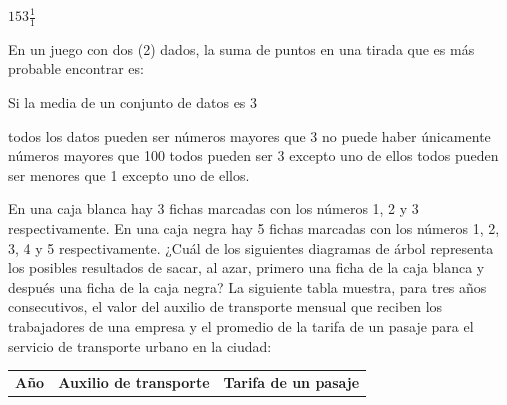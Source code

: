 \documentclass[10pt,letterpaper,addpoints]{exam}
\begin{document}
\begin{multicols}{2}
\begin{questions}
\begin{oneparchoices}
\choice $153 \frac{1}{1}$
\end{oneparchoices}
\question En un juego con dos (2) dados, la suma de puntos en una tirada que es más probable encontrar es:

\begin{oneparchoices}
\end{oneparchoices}
\question Si la media de un conjunto de datos es 3
\begin{choices}
\choice todos los datos pueden ser números mayores que 3
\CorrectChoice no puede haber únicamente números mayores que 100
\choice todos pueden ser 3 excepto uno de ellos
\choice todos pueden ser menores que 1 excepto uno de ellos.
\end{choices}
\question En una caja blanca hay 3 fichas marcadas con los números 1, 2 y 3 respectivamente. En una caja negra hay 5 fichas marcadas con los números 1, 2, 3, 4 y 5 respectivamente. ¿Cuál de los siguientes diagramas de árbol representa los posibles resultados de sacar, al
azar, primero una ficha de la caja blanca y después una ficha de la caja negra?
\question La siguiente tabla muestra, para tres años consecutivos, el valor del auxilio de transporte mensual que reciben los trabajadores de una empresa y el promedio de la tarifa de un pasaje para el servicio de transporte urbano en la ciudad:
\begin{center}
\begin{tabular}{|c|p{3cm}|p{3cm}|}
\hline 
\textbf{Año} & \textbf{Auxilio de transporte} & \textbf{Tarifa de un pasaje} \\ 

\end{tabular}
\end{center}
\end{questions}
\end{multicols}
\end{document}
